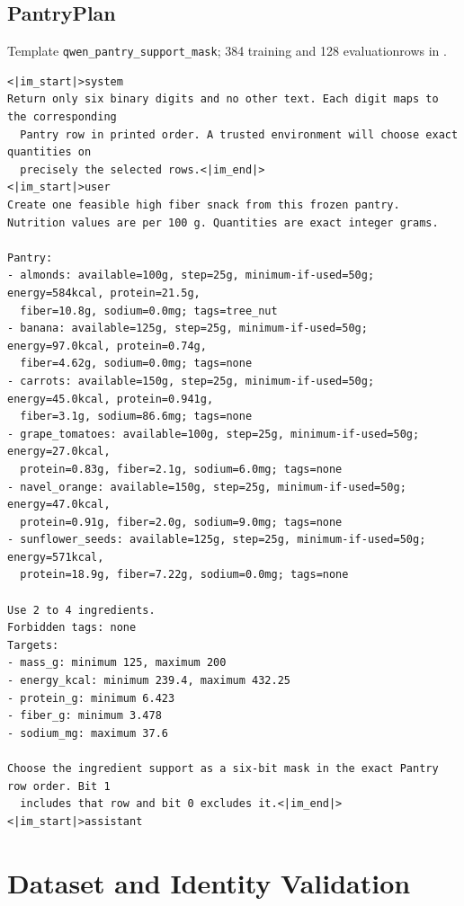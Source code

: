 \documentclass{article}
\newcommand{\1}{\mathbf 1}
\theoremstyle{remark}
\theoremstyle{definition}
\theoremstyle{plain}
\begin{document}
\subsection{PantryPlan}
\label{app:prompt-pantry}

\noindent Template \texttt{qwen\_pantry\_support\_mask}; 384 training and 128 evaluation\linebreak rows in .

\begin{Verbatim}[fontsize=\scriptsize,frame=single,framesep=4pt,rulecolor=\color{black!25}]
<|im_start|>system
Return only six binary digits and no other text. Each digit maps to the corresponding
  Pantry row in printed order. A trusted environment will choose exact quantities on
  precisely the selected rows.<|im_end|>
<|im_start|>user
Create one feasible high fiber snack from this frozen pantry.
Nutrition values are per 100 g. Quantities are exact integer grams.

Pantry:
- almonds: available=100g, step=25g, minimum-if-used=50g; energy=584kcal, protein=21.5g,
  fiber=10.8g, sodium=0.0mg; tags=tree_nut
- banana: available=125g, step=25g, minimum-if-used=50g; energy=97.0kcal, protein=0.74g,
  fiber=4.62g, sodium=0.0mg; tags=none
- carrots: available=150g, step=25g, minimum-if-used=50g; energy=45.0kcal, protein=0.941g,
  fiber=3.1g, sodium=86.6mg; tags=none
- grape_tomatoes: available=100g, step=25g, minimum-if-used=50g; energy=27.0kcal,
  protein=0.83g, fiber=2.1g, sodium=6.0mg; tags=none
- navel_orange: available=150g, step=25g, minimum-if-used=50g; energy=47.0kcal,
  protein=0.91g, fiber=2.0g, sodium=9.0mg; tags=none
- sunflower_seeds: available=125g, step=25g, minimum-if-used=50g; energy=571kcal,
  protein=18.9g, fiber=7.22g, sodium=0.0mg; tags=none

Use 2 to 4 ingredients.
Forbidden tags: none
Targets:
- mass_g: minimum 125, maximum 200
- energy_kcal: minimum 239.4, maximum 432.25
- protein_g: minimum 6.423
- fiber_g: minimum 3.478
- sodium_mg: maximum 37.6

Choose the ingredient support as a six-bit mask in the exact Pantry row order. Bit 1
  includes that row and bit 0 excludes it.<|im_end|>
<|im_start|>assistant
\end{Verbatim}


\clearpage
\section{Dataset and Identity Validation}
\label{app:data}
\end{document}
